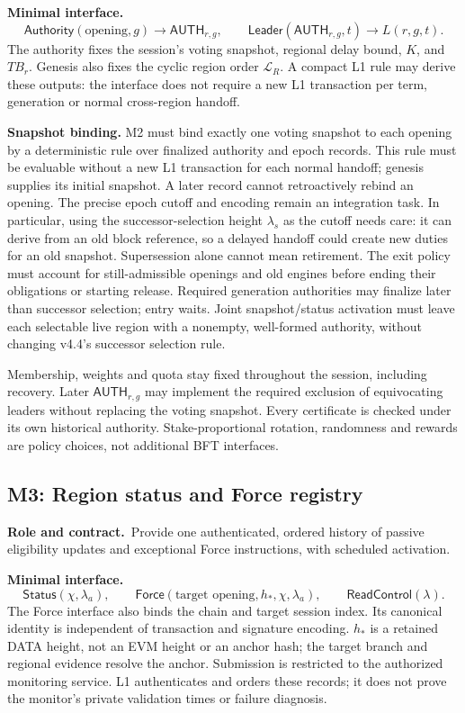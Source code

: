 \documentclass[11pt,a4paper]{article}
\newcommand{\api}[1]{\ensuremath{\mathsf{#1}}}
\newcommand{\TB}{\mathit{TB}}
\newcommand{\role}{\textbf{Role and contract.}\ }
\newcommand{\iface}{\textbf{Minimal interface.}\ }
\begin{document}
\iface
\[
 \api{Authority}(\text{opening},g)\to\api{AUTH}_{r,g},\qquad
 \api{Leader}(\api{AUTH}_{r,g},t)\to L(r,g,t).
\]
The authority fixes the session's voting snapshot, regional delay bound,
$K$, and $\TB_r$. Genesis also fixes the cyclic region order
$\mathcal L_R$. A compact L1 rule may derive these outputs: the interface
does not require a new L1 transaction per term, generation or normal
cross-region handoff.

\textbf{Snapshot binding.} M2 must bind exactly one voting snapshot to
each opening by a deterministic rule over finalized authority and epoch
records. This rule must be evaluable without a new L1 transaction for
each normal handoff; genesis supplies its initial snapshot. A later
record cannot retroactively rebind an opening. The precise epoch cutoff
and encoding remain an integration task. In particular, using the
successor-selection height $\lambda_s$ as the cutoff needs care: it can
derive from an old block reference, so a delayed handoff could create new
duties for an old snapshot. Supersession alone cannot mean retirement.
The exit policy must account for still-admissible openings and old engines
before ending their obligations or starting release. Required generation
authorities may finalize later than successor selection; entry waits.
Joint snapshot/status activation must leave each selectable live region
with a nonempty, well-formed authority, without changing v4.4's successor
selection rule.

Membership, weights and quota stay fixed throughout the session,
including recovery. Later $\api{AUTH}_{r,g}$ may implement the required
exclusion of equivocating leaders without replacing the voting snapshot.
Every certificate is checked under its own historical authority.
Stake-proportional rotation, randomness and rewards are policy choices,
not additional BFT interfaces.

\subsection{M3: Region status and Force registry}\label{sec:control}
\role Provide one authenticated, ordered history of passive eligibility
updates and exceptional Force instructions, with scheduled activation.

\iface
\[
 \api{Status}(\chi,\lambda_a),\qquad
 \api{Force}(\text{target opening},h_*,\chi,\lambda_a),\qquad
 \api{ReadControl}(\lambda).
\]
The Force interface also binds the chain and target session index. Its
canonical identity is independent of transaction and signature encoding.
$h_*$ is a retained DATA height, not an EVM height or an anchor hash;
the target branch and regional evidence resolve the anchor. Submission
is restricted to the authorized monitoring service. L1 authenticates and
orders these records; it does not prove the monitor's private validation
times or failure diagnosis.
\end{document}
